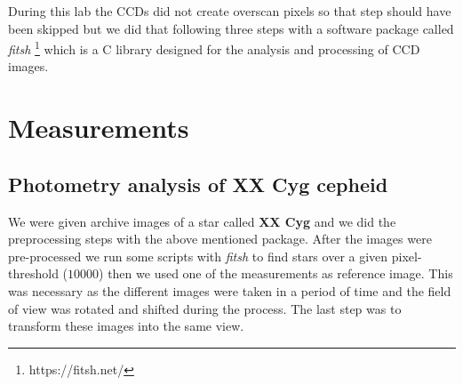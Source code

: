 \documentclass[a4paper,12pt]{article}
\begin{document}
\par During this lab the CCDs did not create overscan pixels so that step should have been skipped but we did that
following three steps with a software package called \textit{fitsh} \footnote{https://fitsh.net/} which is a C library
designed for the analysis and processing of CCD images.

\section{Measurements}

\subsection{Photometry analysis of XX Cyg cepheid}

\par We were given archive images of a star called \textbf{XX Cyg} and we did the preprocessing steps with the above mentioned package.
After the images were pre-processed we run some scripts with \textit{fitsh} to find stars over a given pixel-threshold ($10000$) then we
used one of the measurements as reference image. This was necessary as the different images were taken in a period of time and
the field of view was rotated and shifted during the process. The last step was to transform these images into the same view.

\vspace{0.5cm}
\end{document}

